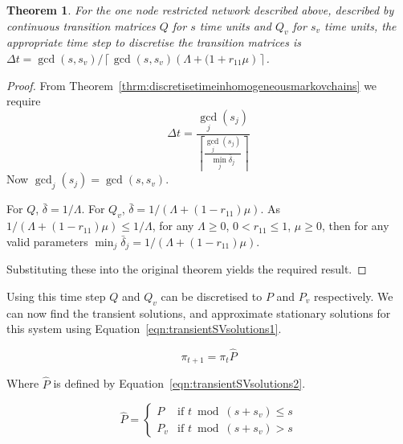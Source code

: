 \documentclass{article}
\newtheorem{theorem}{Theorem}
\begin{document}
\begin{theorem}
For the one node restricted network described above, described by continuous transition matrices $Q$ for $s$ time units and $Q_v$ for $s_v$ time units, the appropriate time step to discretise the transition matrices is $\Delta t = \gcd(s, s_v) / \left\lceil \gcd(s, s_v) \left(\Lambda + (1 + r_{11}\mu\right) \right\rceil$.
\end{theorem}

\begin{proof}
From Theorem~\ref{thrm:discretisetimeinhomogeneousmarkovchains} we require
\begin{equation*}
\Delta t = \frac{\gcd_j(s_j)}{\left\lceil \frac{\gcd_j(s_j)}{\min_j \bar{\delta}_j} \right\rceil}
\end{equation*}
Now $\gcd_j(s_j) = \gcd(s, s_v)$.

For $Q$, $\bar{\delta} = 1 / \Lambda$.
For $Q_v$, $\bar{\delta} = 1 /(\Lambda + (1 - r_{11})\mu)$.
As $1 /(\Lambda + (1 - r_{11})\mu) \leq 1 / \Lambda$, for any $\Lambda \geq 0$, $0 < r_{11} \leq 1$, $\mu \geq 0$, then for any valid parameters $\min_j \bar{\delta}_j = 1 /(\Lambda + (1 - r_{11})\mu)$.

Substituting these into the original theorem yields the required result.
\end{proof}

Using this time step $Q$ and $Q_v$ can be discretised to $P$ and $P_v$ respectively.
We can now find the transient solutions, and approximate stationary solutions for this system using Equation~\ref{eqn:transientSVsolutions1}.

\begin{equation}\label{eqn:transientSVsolutions1}
\pi_{t+1} = \pi_{t} \hat{P}
\end{equation}

Where $\hat{P}$ is defined by Equation~\ref{eqn:transientSVsolutions2}.

\begin{equation}\label{eqn:transientSVsolutions2}
\hat{P} = \left\{
    \begin{array}{cc}
    P & \text{if } t \bmod (s + s_v) \leq s \\
    P_v & \text{if } t \bmod (s + s_v) > s
    \end{array}\right.
\end{equation}
\end{document}

